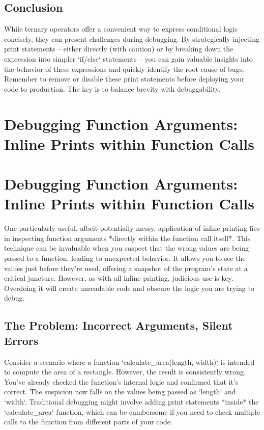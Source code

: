 \documentclass{article}
\begin{document}
{{{{\subsection*{Conclusion}

While ternary operators offer a convenient way to express conditional logic concisely, they can present challenges during debugging. By strategically injecting print statements – either directly (with caution) or by breaking down the expression into simpler `if/else` statements – you can gain valuable insights into the behavior of these expressions and quickly identify the root cause of bugs. Remember to remove or disable these print statements before deploying your code to production. The key is to balance brevity with debuggability.

\newpage

\section*{Debugging Function Arguments: Inline Prints within Function Calls} %
\label{chapter-6-5-Debugging_Function_Arguments__Inline_Pri}

\section*{Debugging Function Arguments: Inline Prints within Function Calls}

One particularly useful, albeit potentially messy, application of inline printing lies in inspecting function arguments *directly within the function call itself*. This technique can be invaluable when you suspect that the wrong values are being passed to a function, leading to unexpected behavior. It allows you to see the values just before they're used, offering a snapshot of the program's state at a critical juncture. However, as with all inline printing, judicious use is key. Overdoing it will create unreadable code and obscure the logic you are trying to debug.

\subsection*{The Problem: Incorrect Arguments, Silent Errors}

Consider a scenario where a function `calculate_area(length, width)` is intended to compute the area of a rectangle. However, the result is consistently wrong. You've already checked the function's internal logic and confirmed that it's correct. The suspicion now falls on the values being passed as `length` and `width`. Traditional debugging might involve adding print statements *inside* the `calculate_area` function, which can be cumbersome if you need to check multiple calls to the function from different parts of your code.

}}}}
\end{document}
